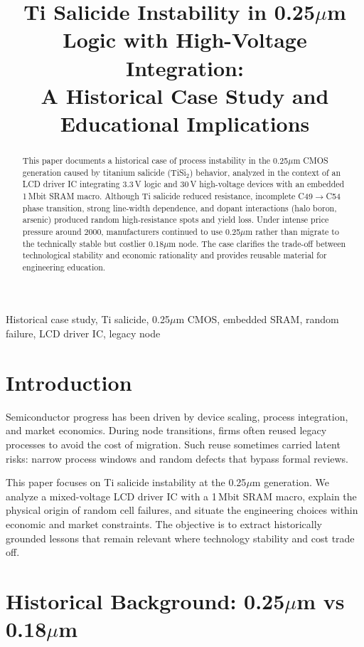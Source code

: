 \documentclass[conference]{IEEEtran}
\title{Ti Salicide Instability in 0.25$\mu$m Logic with High-Voltage Integration:\\
A Historical Case Study and Educational Implications}
\author{
\IEEEauthorblockN{Shinichi Samizo}
\IEEEauthorblockA{Independent Semiconductor Researcher\\
Project Design Hub, Samizo-AITL\\
\textit{Email:} \href{mailto:shin3t72@gmail.com}{shin3t72@gmail.com}\quad
\textit{GitHub:} \href{https://github.com/Samizo-AITL}{Samizo-AITL}}
}
\begin{document}
\maketitle

\begin{abstract}
This paper documents a historical case of process instability in the 0.25$\mu$m CMOS generation caused by titanium salicide (TiSi$_2$) behavior, analyzed in the context of an LCD driver IC integrating 3.3\,V logic and 30\,V high-voltage devices with an embedded 1\,Mbit SRAM macro. Although Ti salicide reduced resistance, incomplete C49$\rightarrow$C54 phase transition, strong line-width dependence, and dopant interactions (halo boron, arsenic) produced random high-resistance spots and yield loss. Under intense price pressure around 2000, manufacturers continued to use 0.25$\mu$m rather than migrate to the technically stable but costlier 0.18$\mu$m node. The case clarifies the trade-off between technological stability and economic rationality and provides reusable material for engineering education.
\end{abstract}

\begin{IEEEkeywords}
Historical case study, Ti salicide, 0.25$\mu$m CMOS, embedded SRAM, random failure, LCD driver IC, legacy node
\end{IEEEkeywords}

\section{Introduction}
Semiconductor progress has been driven by device scaling, process integration, and market economics. During node transitions, firms often reused legacy processes to avoid the cost of migration. Such reuse sometimes carried latent risks: narrow process windows and random defects that bypass formal reviews.

This paper focuses on Ti salicide instability at the 0.25$\mu$m generation. We analyze a mixed-voltage LCD driver IC with a 1\,Mbit SRAM macro, explain the physical origin of random cell failures, and situate the engineering choices within economic and market constraints. The objective is to extract historically grounded lessons that remain relevant where technology stability and cost trade off.

\section{Historical Background: 0.25$\mu$m vs 0.18$\mu$m}
\end{document}
